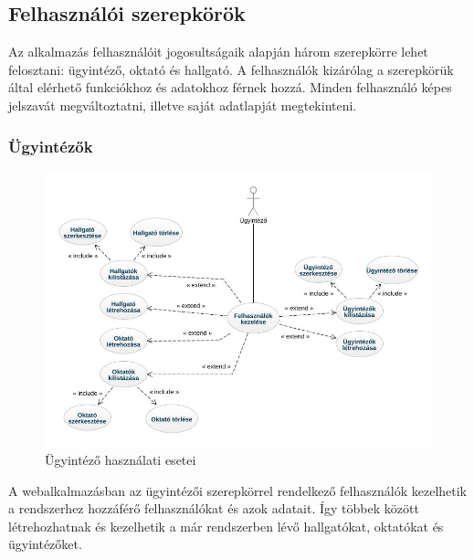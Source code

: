 \documentclass[
]{thesis-ekf}
\theoremstyle{definition}
\theoremstyle{remark}
\begin{document}
	\subsection{Felhasználói szerepkörök}
	Az alkalmazás felhasználóit jogosultságaik alapján három szerepkörre lehet felosztani: ügyintéző, oktató és hallgató.
	A felhasználók kizárólag a szerepkörük által elérhető funkciókhoz és adatokhoz férnek hozzá. Minden felhasználó képes jelszavát megváltoztatni, illetve saját adatlapját megtekinteni.
	
	
	\subsubsection{Ügyintézők}
	\begin{figure}[!h]
		\centering
		\includegraphics[width=14cm]{kepek/admin_usecase.jpeg}
		\caption{Ügyintéző használati esetei}
		\label{fig:ugyintezo_usecase}
	\end{figure}
	A webalkalmazásban az ügyintézői szerepkörrel rendelkező felhasználók kezelhetik a rendszerhez hozzáférő felhasználókat és azok adatait. Így többek között létrehozhatnak és kezelhetik a már rendszerben lévő hallgatókat, oktatókat és ügyintézőket.
	\newpage
\end{document}
